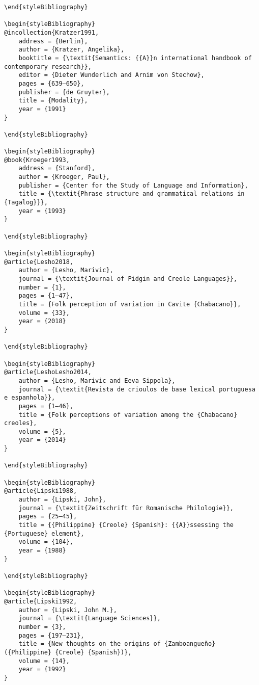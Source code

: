 \begin{stylelsUnNumberedSection}
\begin{verbatim}
\end{styleBibliography}

\begin{styleBibliography}
@incollection{Kratzer1991,
	address = {Berlin},
	author = {Kratzer, Angelika},
	booktitle = {\textit{Semantics: {{A}}n international handbook of contemporary research}},
	editor = {Dieter Wunderlich and Arnim von Stechow},
	pages = {639–650},
	publisher = {de Gruyter},
	title = {Modality},
	year = {1991}
}

\end{styleBibliography}

\begin{styleBibliography}
@book{Kroeger1993,
	address = {Stanford},
	author = {Kroeger, Paul},
	publisher = {Center for the Study of Language and Information},
	title = {\textit{Phrase structure and grammatical relations in {Tagalog}}},
	year = {1993}
}

\end{styleBibliography}

\begin{styleBibliography}
@article{Lesho2018,
	author = {Lesho, Marivic},
	journal = {\textit{Journal of Pidgin and Creole Languages}},
	number = {1},
	pages = {1–47},
	title = {Folk perception of variation in Cavite {Chabacano}},
	volume = {33},
	year = {2018}
}

\end{styleBibliography}

\begin{styleBibliography}
@article{LeshoLesho2014,
	author = {Lesho, Marivic and Eeva Sippola},
	journal = {\textit{Revista de crioulos de base lexical portuguesa e espanhola}},
	pages = {1–46},
	title = {Folk perceptions of variation among the {Chabacano} creoles},
	volume = {5},
	year = {2014}
}

\end{styleBibliography}

\begin{styleBibliography}
@article{Lipski1988,
	author = {Lipski, John},
	journal = {\textit{Zeitschrift für Romanische Philologie}},
	pages = {25–45},
	title = {{Philippine} {Creole} {Spanish}: {{A}}ssessing the {Portuguese} element},
	volume = {104},
	year = {1988}
}

\end{styleBibliography}

\begin{styleBibliography}
@article{Lipski1992,
	author = {Lipski, John M.},
	journal = {\textit{Language Sciences}},
	number = {3},
	pages = {197–231},
	title = {New thoughts on the origins of {Zamboangueño} ({Philippine} {Creole} {Spanish})},
	volume = {14},
	year = {1992}
}


\end{verbatim}
\end{stylelsUnNumberedSection}
